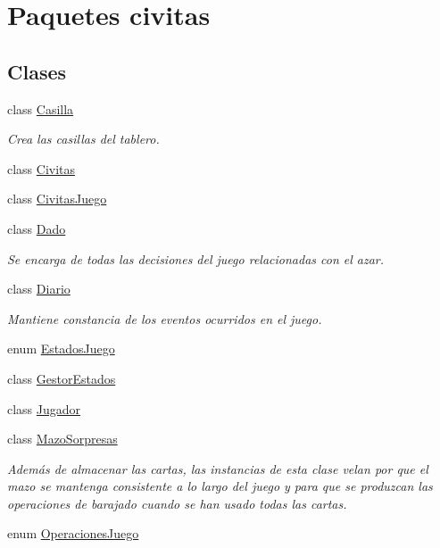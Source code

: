 \hypertarget{namespacecivitas}{}\section{Paquetes civitas}
\label{namespacecivitas}
\subsection*{Clases}
\begin{DoxyCompactItemize}
\item 
class \hyperlink{classcivitas_1_1Casilla}{Casilla}
\begin{DoxyCompactList}\small\item\em Crea las casillas del tablero. \end{DoxyCompactList}\item 
class \hyperlink{classcivitas_1_1Civitas}{Civitas}
\item 
class \hyperlink{classcivitas_1_1CivitasJuego}{Civitas\+Juego}
\item 
class \hyperlink{classcivitas_1_1Dado}{Dado}
\begin{DoxyCompactList}\small\item\em Se encarga de todas las decisiones del juego relacionadas con el azar. \end{DoxyCompactList}\item 
class \hyperlink{classcivitas_1_1Diario}{Diario}
\begin{DoxyCompactList}\small\item\em Mantiene constancia de los eventos ocurridos en el juego. \end{DoxyCompactList}\item 
enum \hyperlink{enumcivitas_1_1EstadosJuego}{Estados\+Juego}
\item 
class \hyperlink{classcivitas_1_1GestorEstados}{Gestor\+Estados}
\item 
class \hyperlink{classcivitas_1_1Jugador}{Jugador}
\item 
class \hyperlink{classcivitas_1_1MazoSorpresas}{Mazo\+Sorpresas}
\begin{DoxyCompactList}\small\item\em Además de almacenar las cartas, las instancias de esta clase velan por que el mazo se mantenga consistente a lo largo del juego y para que se produzcan las operaciones de barajado cuando se han usado todas las cartas. \end{DoxyCompactList}\item 
enum \hyperlink{enumcivitas_1_1OperacionesJuego}{Operaciones\+Juego}

\end{DoxyCompactItemize}
